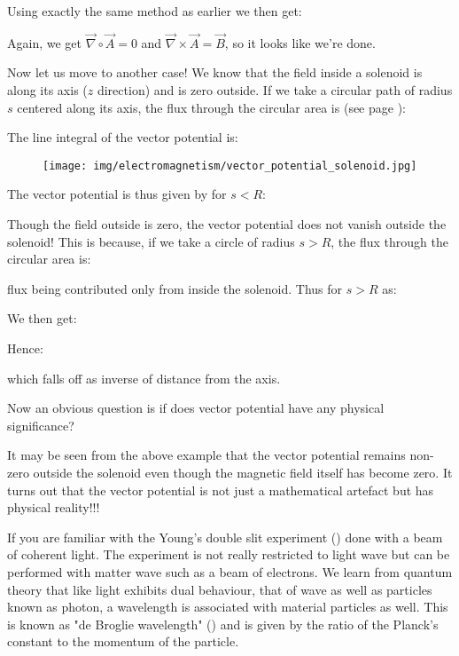 	Using exactly the same method as earlier we then get:
	
	Again, we get $\vec \nabla \circ \vec{A}=0$ and $\vec \nabla \times \vec{A}=\vec{B}$, so it looks like we're done.
	
	Now let us move to another case! We know that the field inside a solenoid is along its axis ($z$ direction) and is zero outside. If we take a circular path of radius $s$ centered along its axis, the flux through the circular area is (see page \pageref{solenoid}):
	
	The line integral of the vector potential is:
		
	\begin{figure}[H]
		\centering
		\texttt{[image: img/electromagnetism/vector\_potential\_solenoid.jpg]}
	\end{figure}
	The vector potential is thus given by for $s<R$:
	
	Though the field outside is zero, the vector potential does not vanish outside the solenoid! This is because, if we take a circle of radius $s>R$, the flux through the circular area is:
	
	flux being contributed only from inside the solenoid. Thus for $s>R$ as:
	
	We then get:
	
	Hence:
	
	which falls off as inverse of distance from the axis.
	
	Now an obvious question is if does vector potential have any physical significance?
	
	It may be seen from the above example that the vector potential remains non-zero outside the solenoid even though the magnetic field itself has become zero. It turns out that the vector potential is not just a mathematical artefact but has physical reality!!!
	
	If you are familiar with the Young’s double slit experiment () done with a beam of coherent light. The experiment is not really restricted to light wave but can be performed with matter wave such as a beam of electrons. We learn from quantum theory that like light exhibits dual behaviour, that of wave as well as particles known as photon, a wavelength is associated with material particles as well. This is known as "de Broglie wavelength" () and is given by the ratio of the Planck’s constant to the momentum of the particle.
	
